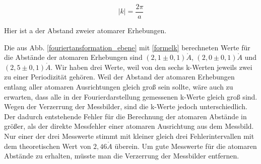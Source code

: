 \documentclass[10pt,a4paper]{article}
\begin{document}
\begin{equation}
	|k| = \frac{2\pi}{a}
	\label{formelk}
\end{equation}

Hier ist a der Abstand zweier atomarer Erhebungen.

Die aus Abb. \ref{fouriertansformation_ebene} mit \eqref{formelk} berechneten Werte für die Abstände der atomaren Erhebungen sind $(2,1\pm0,1)\mathring{A}$, $(2,0\pm0,1)\mathring{A}$ und $(2,5\pm0,1)\mathring{A}$. Wir haben drei Werte, weil von den sechs k-Werten jeweils zwei zu einer Periodizität gehören. Weil der Abstand der atomaren Erhebungen entlang aller atomaren Ausrichtungen gleich groß sein sollte, wäre auch zu erwarten, dass alle in der Fourierdarstellung gemessenen k-Werte gleich groß sind. Wegen der Verzerrung der Messbilder, sind die k-Werte jedoch unterschiedlich. Der dadurch entstehende Fehler für die Berechnung der atomaren Abstände in größer, als der direkte Messfehler einer atomaren Ausrichtung aus dem Messbild. 
Nur einer der drei Messwerte stimmt mit kleiner gleich drei Fehlerintervallen mit dem theoretischen Wert von $2,46\mathring{A}$ überein.
Um gute Messwerte für die atomaren Abstände zu erhalten, müsste man die Verzerrung der Messbilder entfernen.

\end{document}

